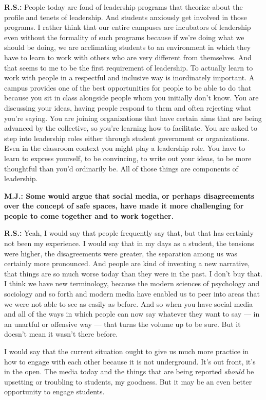 \textbf{R.S.:} People today are fond of leadership programs that
theorize about the profile and tenets of leadership. And students
anxiously get involved in those programs. I rather think that our entire
campuses are incubators of leadership even without the formality of such
programs because if we're doing what we should be doing, we are
acclimating students to an environment in which they have to learn to
work with others who are very different from themselves. And that seems
to me to be the first requirement of leadership. To actually learn to
work with people in a respectful and inclusive way is inordinately
important. A campus provides one of the best opportunities for people to
be able to do that because you sit in class alongside people whom you
initially don't know. You are discussing your ideas, having people
respond to them and often rejecting what you're saying. You are joining
organizations that have certain aims that are being advanced by the
collective, so you're learning how to facilitate. You are asked to step
into leadership roles either through student government or
organizations. Even in the classroom context you might play a leadership
role. You have to learn to express yourself, to be convincing, to write
out your ideas, to be more thoughtful than you'd ordinarily be. All of
those things are components of leadership.

\textbf{M.J.: Some would argue that social media, or perhaps
disagreements over the concept of safe spaces, have made it more
challenging for people to come together and to work together.}

\textbf{R.S.:} Yeah, I would say that people frequently say that, but
that has certainly not been my experience. I would say that in my days
as a student, the tensions were higher, the disagreements were greater,
the separation among us was certainly more pronounced. And people are
kind of inventing a new narrative, that things are so much worse today
than they were in the past. I don't buy that. I think we have new
terminology, because the modern sciences of psychology and sociology and
so forth and modern media have enabled us to peer into areas that we
were not able to see as easily as before. And so when you have social
media and all of the ways in which people can now say whatever they want
to say --- in an unartful or offensive way --- that turns the volume up
to be sure. But it doesn't mean it wasn't there before.

I would say that the current situation ought to give us much more
practice in how to engage with each other because it is not underground.
It's out front, it's in the open. The media today and the things that
are being reported \emph{should} be upsetting or troubling to students,
my goodness. But it may be an even better opportunity to engage
students.

